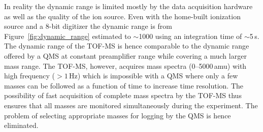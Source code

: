 \documentclass[aip,rsi]{revtex4-1}
\begin{document}
In reality the dynamic range is limited mostly by the data acquisition hardware as well as the quality of the ion source. Even with the home-built ionization source and a 8-bit digitizer the dynamic range is from Figure~\ref{fig:dynamic_range} estimated to $\sim$1000 using an integration time of $\sim$5\,s. The dynamic range of the TOF-MS is hence comparable to the dynamic range offered by a QMS at constant preamplifier range while covering a much larger mass range. The TOF-MS, however, acquires mass spectra (0--5000\,amu) with high frequency ($>1$\,Hz) which is impossible with a QMS where only a few masses can be followed as a function of time to increase time resolution. The possibility of fast acquisition of complete mass spectra by the TOF-MS thus ensures that all masses are monitored simultaneously during the experiment. The problem of selecting appropriate masses for logging by the QMS is hence eliminated.
\end{document}
